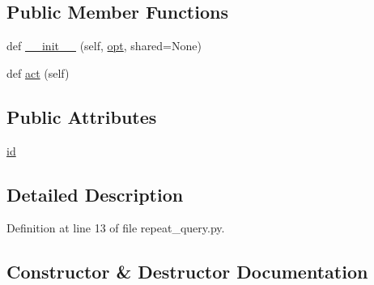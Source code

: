 \subsection*{Public Member Functions}
\begin{DoxyCompactItemize}
\item 
def \hyperlink{classparlai_1_1agents_1_1repeat__query_1_1repeat__query_1_1RepeatQueryAgent_a1ebfe807ecdf068282d681b5047b035a}{\+\_\+\+\_\+init\+\_\+\+\_\+} (self, \hyperlink{classparlai_1_1core_1_1agents_1_1Agent_ab3b45d2754244608c75d4068b90cd051}{opt}, shared=None)
\item 
def \hyperlink{classparlai_1_1agents_1_1repeat__query_1_1repeat__query_1_1RepeatQueryAgent_a7db5db4eda3e033a9022a4f4fe74419b}{act} (self)
\end{DoxyCompactItemize}
\subsection*{Public Attributes}
\begin{DoxyCompactItemize}
\item 
\hyperlink{classparlai_1_1agents_1_1repeat__query_1_1repeat__query_1_1RepeatQueryAgent_ab6fbd1dbd2b197d0ab72d3f9f11c9d8a}{id}
\end{DoxyCompactItemize}


\subsection{Detailed Description}


Definition at line 13 of file repeat\+\_\+query.\+py.



\subsection{Constructor \& Destructor Documentation}
\mbox{\label{classparlai_1_1agents_1_1repeat__query_1_1repeat__query_1_1RepeatQueryAgent_a1ebfe807ecdf068282d681b5047b035a}} 
